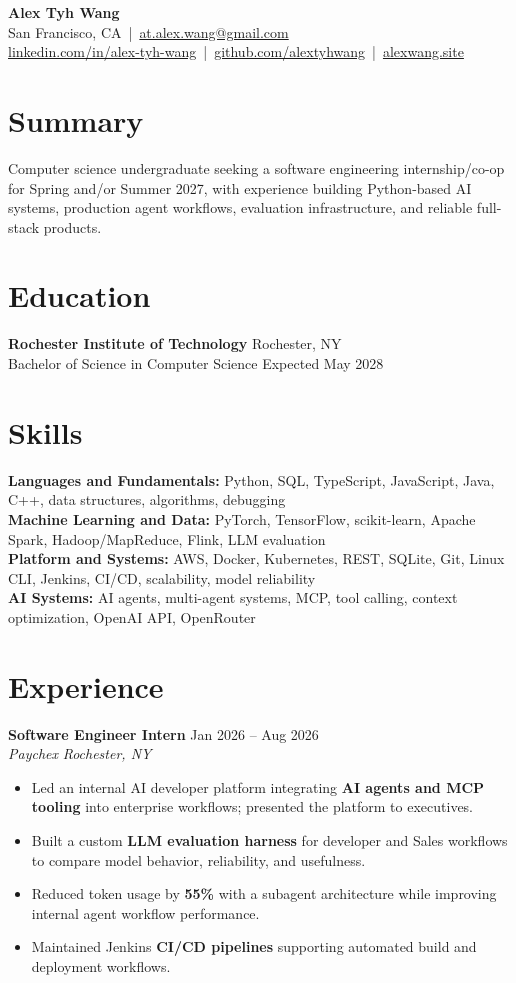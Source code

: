 \documentclass[10pt,letterpaper]{article}
\newif\ifresumeFirstRole
\newcommand{\resumeRole}[4]{%
  \ifresumeFirstRole
    \global\resumeFirstRolefalse
  \else
    \vspace{0pt plus 1fill}%
  \fi
  \textbf{#1} \hfill #2\\
  \textit{#3} \hfill \textit{#4}
}
\begin{document}
\begin{center}
{\Large \textbf{Alex Tyh Wang}}\\
San Francisco, CA \,|\, \href{mailto:at.alex.wang@gmail.com}{at.alex.wang@gmail.com}\\
\small \href{https://www.linkedin.com/in/alex-tyh-wang/}{linkedin.com/in/alex-tyh-wang} \,|\, \href{https://github.com/alextyhwang}{github.com/alextyhwang} \,|\, \href{https://alexwang.site}{alexwang.site}
\end{center}

\section*{Summary}
Computer science undergraduate seeking a software engineering internship/co-op for Spring and/or Summer 2027, with experience building Python-based AI systems, production agent workflows, evaluation infrastructure, and reliable full-stack products.

\section*{Education}
\textbf{Rochester Institute of Technology} \hfill Rochester, NY\\
Bachelor of Science in Computer Science \hfill Expected May 2028

\section*{Skills}
\textbf{Languages and Fundamentals:} Python, SQL, TypeScript, JavaScript, Java, C++, data structures, algorithms, debugging\\
\textbf{Machine Learning and Data:} PyTorch, TensorFlow, scikit-learn, Apache Spark, Hadoop/MapReduce, Flink, LLM evaluation\\
\textbf{Platform and Systems:} AWS, Docker, Kubernetes, REST, SQLite, Git, Linux CLI, Jenkins, CI/CD, scalability, model reliability\\
\textbf{AI Systems:} AI agents, multi-agent systems, MCP, tool calling, context optimization, OpenAI API, OpenRouter

\section*{Experience}
\resumeRole{Software Engineer Intern}{Jan 2026 -- Aug 2026}{Paychex}{Rochester, NY}
\begin{itemize}
  \item Led an internal AI developer platform integrating \textbf{AI agents and MCP tooling} into enterprise workflows; presented the platform to executives.
  \item Built a custom \textbf{LLM evaluation harness} for developer and Sales workflows to compare model behavior, reliability, and usefulness.
  \item Reduced token usage by \textbf{55\%} with a subagent architecture while improving internal agent workflow performance.
  \item Maintained Jenkins \textbf{CI/CD pipelines} supporting automated build and deployment workflows.
\end{itemize}
\end{document}
